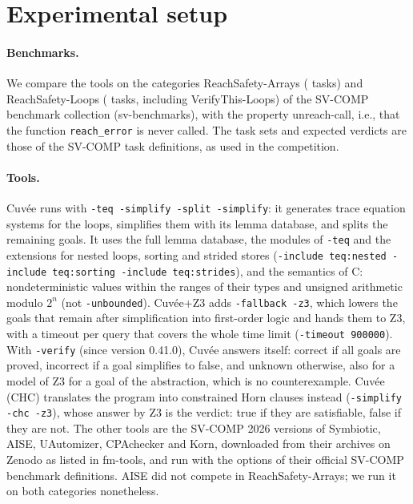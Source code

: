 
\section*{Experimental setup}

\paragraph{Benchmarks.}
We compare the tools on the categories ReachSafety-Arrays (\ArraysTasks{} tasks) and ReachSafety-Loops
(\LoopsTasks{} tasks, including VerifyThis-Loops) of the SV-COMP benchmark collection (sv-benchmarks),
with the property unreach-call, i.e., that the function \texttt{reach\_error} is never called.
The task sets and expected verdicts are those of the SV-COMP task definitions, as used in the
competition.

\paragraph{Tools.}
Cuvée runs with \texttt{-teq -simplify -split -simplify}: it generates trace equation systems for
the loops, simplifies them with its lemma database, and splits the remaining goals. It uses the full
lemma database, the modules of \texttt{-teq} and the extensions for nested loops, sorting and strided
stores (\texttt{-include teq:nested -include teq:sorting -include teq:strides}), and the semantics of C:
nondeterministic values within the ranges of their types and unsigned arithmetic modulo $2^n$ (not
\texttt{-unbounded}). Cuvée+Z3 adds \texttt{-fallback -z3}, which lowers the goals that remain after
simplification into first-order logic and hands them to Z3, with a timeout per query that covers the
whole time limit (\texttt{-timeout 900000}). With \texttt{-verify} (since version 0.41.0), Cuvée
answers itself: correct if all goals are proved, incorrect if a goal simplifies to false, and unknown
otherwise, also for a model of Z3 for a goal of the abstraction, which is no counterexample. Cuvée (CHC)
translates the program into constrained Horn clauses instead (\texttt{-simplify -chc -z3}), whose
answer by Z3 is the verdict: true if they are satisfiable, false if they are not. The other tools are the SV-COMP 2026 versions of Symbiotic, AISE, UAutomizer,
CPAchecker and Korn, downloaded from their archives on Zenodo as listed in fm-tools, and run with
the options of their official SV-COMP benchmark definitions. AISE did not compete in
ReachSafety-Arrays; we run it on both categories nonetheless.


